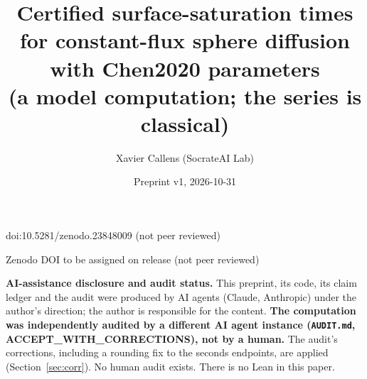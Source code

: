 \documentclass[10pt]{article}
\title{Certified surface-saturation times for constant-flux sphere diffusion\\
with Chen2020 parameters\\
{\large (a model computation; the series is classical)}}
\author{Xavier Callens (SocrateAI Lab)}
\date{Preprint v1, 2026-10-31}
\begin{document}
\maketitle
\begin{center}\small doi:10.5281/zenodo.23848009 \quad (not peer reviewed)\end{center}

\begin{center}\small Zenodo DOI to be assigned on release \quad (not peer reviewed)\end{center}

\noindent\textbf{AI-assistance disclosure and audit status.} This preprint, its code, its claim ledger and the audit were produced by AI agents (Claude, Anthropic) under the author's direction; the author is responsible for the content.
\textbf{The computation was independently audited by a different AI agent instance (\texttt{AUDIT.md}, ACCEPT\_WITH\_CORRECTIONS), not by a human.} The audit's corrections, including a rounding fix to the seconds endpoints, are applied (Section~\ref{sec:corr}). No human audit exists. There is no Lean in this paper.
\end{document}

